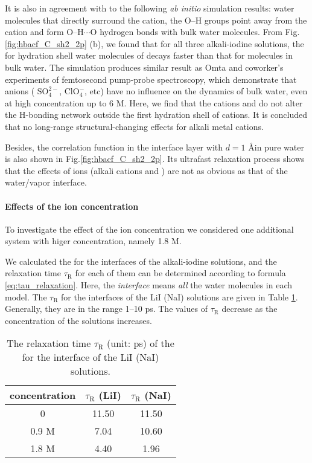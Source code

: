 It is also in agreement with to the following \emph{ab initio} simulation results: water molecules that directly surround the cation, the O--H groups point
away from the cation and form O--H$\cdots$O hydrogen bonds with bulk water molecules.\cite{Hashimoto1994,Ramaniah1998,Kropman2001}
From Fig.\thinspace\ref{fig:hbacf_C_sh2_2p} (b), we found that for all three alkali-iodine solutions, the \CHB for hydration shell water molecules 
of \I decays faster than that for molecules in bulk water.
The simulation produces similar result as Omta and coworker's experiments of femtosecond pump-probe spectroscopy,
which demonstrate that anions ( $\text{SO}^{2-}_4$, $\text{ClO}^-_4$, etc) have no influence on the dynamics of bulk water, 
even at high concentration up to 6 M.\cite{Omta2003, ZhangYanjie2006} 
Here, we find that the cations \Li and \Na do not alter the H-bonding network outside the first hydration shell of cations. 
It is concluded that no long-range structural-changing effects for alkali metal cations.

Besides, the correlation function \CHB in the interface layer with $d=1$ \AA in pure water is also shown in Fig.\ref{fig:hbacf_C_sh2_2p}.
Its ultrafast relaxation process shows that the effects of ions (alkali cations and \I) are not as obvious as that of the water/vapor interface.
\FloatBarrier
\paragraph{Effects of the ion concentration}
To investigate the effect of the ion concentration we considered one additional system with higer concentration, namely 1.8 M.

We calculated the \CHB for the interfaces of the alkali-iodine solutions, 
and the relaxation time $\tau_{\text{R}}$ for each of them can be determined according to formula \ref{eq:tau_relaxation}. 
Here, the \emph{interface} means \emph{all} the water molecules in each model. 
The $\tau_{\text{R}}$ for the interfaces of the LiI (NaI) solutions are given in 
Table \ref{tab:tau_hb}. Generally, they are in the range 1--10 ps. 
The values of $\tau_{\text{R}}$ decrease as the concentration of the solutions increases.
\begin{table}[htbp]
\centering
\caption{\label{tab:tau_hb} 
  The relaxation time $\tau_{\text{R}}$ (unit: ps) of the \CHB  for the interface of the LiI (NaI) solutions.}
\begin{tabular}{ccc}
  concentration  & $\tau_{\text{R}}$ (LiI) & $\tau_{\text{R}}$ (NaI) \\
\hline
  0 & 11.50 & 11.50 \\
  0.9 M & 7.04 & 10.60 \\
  1.8 M & 4.40 & 1.96 
\end{tabular}
\end{table}

